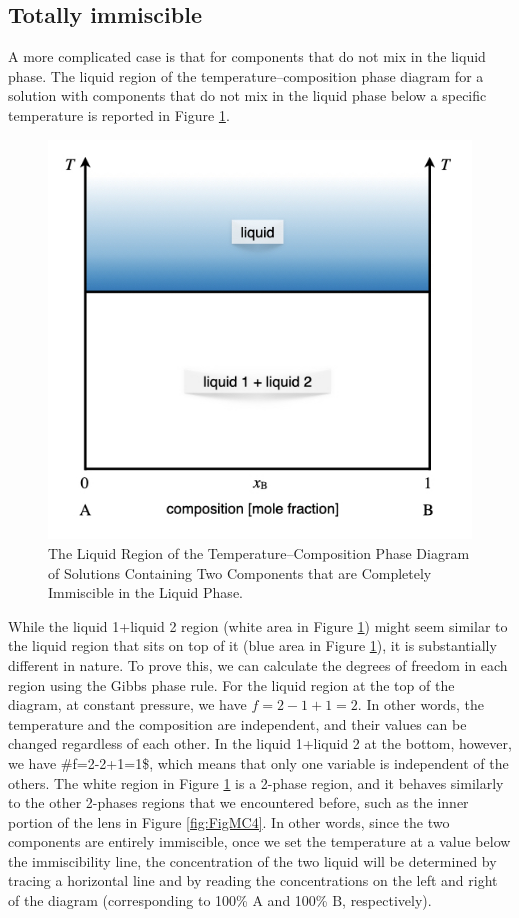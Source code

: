 \documentclass[
  9pt,
]{extbook}
\theoremstyle{definition}
\theoremstyle{definition}
\theoremstyle{definition}
\theoremstyle{remark}
\begin{document}
\hypertarget{totally-immiscible}{%
\subsection{Totally immiscible}\label{totally-immiscible}}

A more complicated case is that for components that do not mix in the liquid phase. The liquid region of the temperature--composition phase diagram for a solution with components that do not mix in the liquid phase below a specific temperature is reported in Figure \ref{fig:FigMC9}.

\begin{figure}

{\centering \includegraphics[width=0.6\linewidth]{./img/OEP_Figures.027} 

}

\caption{The Liquid Region of the Temperature–Composition Phase Diagram of Solutions Containing Two Components that are Completely Immiscible in the Liquid Phase.}\label{fig:FigMC9}
\end{figure}

While the liquid 1+liquid 2 region (white area in Figure \ref{fig:FigMC9}) might seem similar to the liquid region that sits on top of it (blue area in Figure \ref{fig:FigMC9}), it is substantially different in nature. To prove this, we can calculate the degrees of freedom in each region using the Gibbs phase rule. For the liquid region at the top of the diagram, at constant pressure, we have \(f=2-1+1=2\). In other words, the temperature and the composition are independent, and their values can be changed regardless of each other. In the liquid 1+liquid 2 at the bottom, however, we have \#f=2-2+1=1\$, which means that only one variable is independent of the others. The white region in Figure \ref{fig:FigMC9} is a 2-phase region, and it behaves similarly to the other 2-phases regions that we encountered before, such as the inner portion of the lens in Figure \ref{fig:FigMC4}. In other words, since the two components are entirely immiscible, once we set the temperature at a value below the immiscibility line, the concentration of the two liquid will be determined by tracing a horizontal line and by reading the concentrations on the left and right of the diagram (corresponding to 100\% \(\mathrm{A}\) and 100\% \(\mathrm{B}\), respectively).
\end{document}
